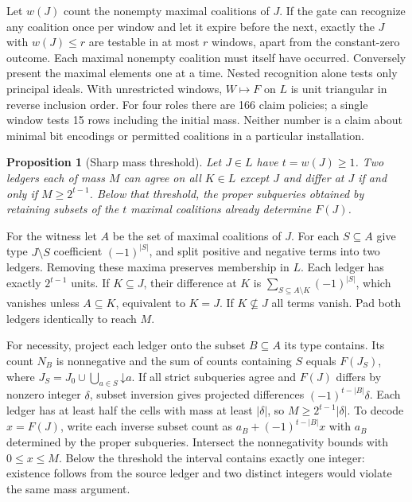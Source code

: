 \documentclass[11pt]{article}
\newtheorem{proposition}{Proposition}
\begin{document}
Let $w(J)$ count the nonempty maximal coalitions of $J$. If the gate can recognize any coalition once per window and let it expire before the next, exactly the $J$ with $w(J)\le r$ are testable in at most $r$ windows, apart from the constant-zero outcome. Each maximal nonempty coalition must itself have occurred. Conversely present the maximal elements one at a time. Nested recognition alone tests only principal ideals. With unrestricted windows, $W\mapsto F$ on $L$ is unit triangular in reverse inclusion order. For four roles there are 166 claim policies; a single window tests 15 rows including the initial mass. Neither number is a claim about minimal bit encodings or permitted coalitions in a particular installation.

\begin{proposition}[Sharp mass threshold]
Let $J\in L$ have $t=w(J)\ge1$. Two ledgers each of mass $M$ can agree on all $K\in L$ except $J$ and differ at $J$ if and only if $M\ge 2^{t-1}$. Below that threshold, the proper subqueries obtained by retaining subsets of the $t$ maximal coalitions already determine $F(J)$.
\end{proposition}
For the witness let $A$ be the set of maximal coalitions of $J$. For each $S\subseteq A$ give type $J\setminus S$ coefficient $(-1)^{|S|}$, and split positive and negative terms into two ledgers. Removing these maxima preserves membership in $L$. Each ledger has exactly $2^{t-1}$ units. If $K\subseteq J$, their difference at $K$ is $\sum_{S\subseteq A\setminus K}(-1)^{|S|}$, which vanishes unless $A\subseteq K$, equivalent to $K=J$. If $K\nsubseteq J$ all terms vanish. Pad both ledgers identically to reach $M$.

For necessity, project each ledger onto the subset $B\subseteq A$ its type contains. Its count $N_B$ is nonnegative and the sum of counts containing $S$ equals $F(J_S)$, where $J_S=J_0\cup\bigcup_{a\in S}\mathord{\downarrow}a$. If all strict subqueries agree and $F(J)$ differs by nonzero integer $\delta$, subset inversion gives projected differences $(-1)^{t-|B|}\delta$. Each ledger has at least half the cells with mass at least $|\delta|$, so $M\ge 2^{t-1}|\delta|$. To decode $x=F(J)$, write each inverse subset count as $a_B+(-1)^{t-|B|}x$ with $a_B$ determined by the proper subqueries. Intersect the nonnegativity bounds with $0\le x\le M$. Below the threshold the interval contains exactly one integer: existence follows from the source ledger and two distinct integers would violate the same mass argument.
\end{document}
